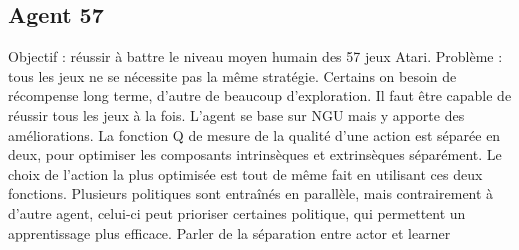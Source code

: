 \documentclass[a4paper,12pt]{report}
\begin{document}
\subsection{Agent 57}
\indent Objectif : réussir à battre le niveau moyen humain des 57 jeux Atari. Problème : tous les jeux ne se nécessite pas la même stratégie. Certains on besoin de récompense long terme, d’autre de beaucoup d’exploration. Il faut être capable de réussir tous les jeux à la fois.
\newline \indent  L’agent se base sur NGU mais y apporte des améliorations. La fonction Q de mesure de la qualité d’une action est séparée en deux, pour optimiser les composants intrinsèques et extrinsèques séparément. Le choix de l’action la plus optimisée est tout de même fait en utilisant ces deux fonctions.
\newline \indent  Plusieurs politiques sont entraînés en parallèle, mais contrairement à d’autre agent, celui-ci peut prioriser certaines politique, qui permettent un apprentissage plus efficace.
\newline
\newline \indent  Parler de la séparation entre actor et learner
\end{document}

